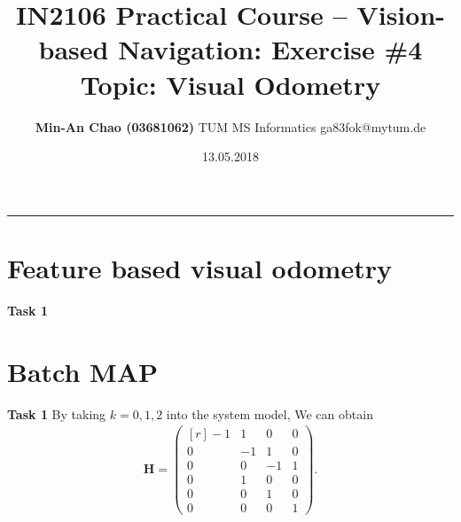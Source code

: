 \documentclass[12pt,a4paper]{article}
\makeatletter
\newcommand{\docTitle}{IN2106 Practical Course -- Vision-based Navigation: Exercise \#4}
\newcommand{\docSubtitle}{Topic: Visual Odometry}
\newcommand{\docAuthor}{Min-An Chao (03681062)}
\newcommand{\docAuthorDept}{TUM MS Informatics}
\newcommand{\docAuthorEmail}{ga83fok@mytum.de}
\newcommand{\docDate}{13.05.2018}
\newcommand{\mtx}[1]{\mathbf{#1}}
\makeatother
\begin{document}
    \title{\vspace{-1.75cm} \large \textsf{\textbf{\docTitle}}\\ \textsf{\docSubtitle}}
    \author{\normalsize \textsf{
        \textbf{\docAuthor} \hspace{6pt}\textbar\hspace{6pt}
        \docAuthorDept \hspace{6pt}\textbar\hspace{6pt}
        \docAuthorEmail}}
    \date{\small \textsf{\docDate}}
    \maketitle 
    \thispagestyle{fancy}
    \vspace{-0.5cm}
    \hrule
    
    \section{Feature based visual odometry}
    \textsf{\textbf{Task 1}}
    

    \section{Batch MAP}
    
    \textsf{\textbf{Task 1}}
    By taking $k=0,1,2$ into the system model,
    We can obtain
    \begin{eqnarray}\label{eq:h_matrix}
      \mtx{H} =
      \begin{pmatrix}[r]
        -1 &  1 &  0 & 0 \\
         0 & -1 &  1 & 0 \\
         0 &  0 & -1 & 1 \\
         0 &  1 &  0 & 0 \\
         0 &  0 &  1 & 0 \\
         0 &  0 &  0 & 1
      \end{pmatrix}.
    \end{eqnarray}
\end{document}
